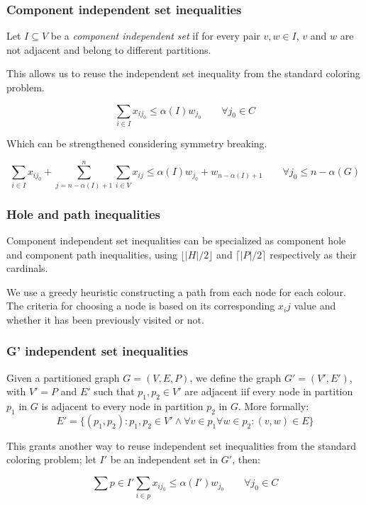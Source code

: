 \documentclass{beamer}
\newcommand{\lpineq}[2]{\[ #1 \qquad #2 \]}
\begin{document}
\begin{frame}
\frametitle{Component independent set inequalities}

Let $I \subseteq V$ be a \textit{component independent set} if for every pair $v,w \in I$, $v$ and $w$ are not adjacent and belong to different partitions.

This allows us to reuse the independent set inequality from the standard coloring problem.

\lpineq{\sum _{i \in I} x_{ij_0} \leq \alpha(I) w_{j_0}}{\forall j_0 \in C}

Which can be strengthened considering symmetry breaking.

\lpineq{\sum _{i \in I} x_{ij_0} + \sum ^n _{j = n - \alpha(I) + 1} \sum _{i \in V} x_{ij} \leq \alpha(I) w_{j_0} + w_{n - \alpha(I) + 1}}
{\forall j_0 \leq n - \alpha(G)}

\end{frame}

\begin{frame}
\frametitle{Hole and path inequalities}

Component independent set inequalities can be specialized as component hole and component path inequalities, using $\lfloor |H|/2 \rfloor$ and $\lceil |P|/2 \rceil$ respectively as their cardinals.

We use a greedy heuristic constructing a path from each node for each colour. The criteria for choosing a node is based on its corresponding $x_ij$ value and whether it has been previously visited or not.

\end{frame}

\begin{frame}
\frametitle{G' independent set inequalities}

Given a partitioned graph $G=(V,E,P)$, we define the graph $G'=(V',E')$, with $V' = P$ and $E'$ such that $p_1,p_2 \in V'$ are adjacent iif every node in partition $p_1$ in $G$ is adjacent to every node in partition $p_2$ in $G$. More formally:
\[
E' = \{(p_1,p_2) : p_1,p_2 \in V' \wedge \forall v \in p_1 \forall w \in p_2 : (v,w) \in E \}
\]

This grants another way to reuse independent set inequalities from the standard coloring problem; let $I'$ be an independent set in $G'$, then:

\lpineq{\sum{p \in I'} \sum_{i \in p} x_{ij_0} \leq \alpha(I') w_{j_0}}{\forall j_0 \in C}

\end{frame}
\end{document}
